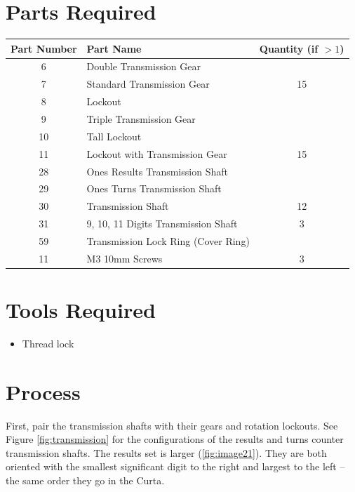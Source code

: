\documentclass[openany]{book}
\begin{document}
\section{Parts Required}
\begin{table}[!ht]
	\centering
	\begin{tabular}{clc}
		Part Number & Part Name & Quantity (if $>1$) \\ \hline
		6 & Double Transmission Gear &  \\
		7 & Standard Transmission Gear & 15 \\
		8 & Lockout &  \\
		9 & Triple Transmission Gear & \\
		10 & Tall Lockout & \\
		11 & Lockout with Transmission Gear & 15 \\
		28 & Ones Results Transmission Shaft & \\
		29 & Ones Turns Transmission Shaft & \\
		30 & Transmission Shaft & 12 \\
		31 & 9, 10, 11 Digits Transmission Shaft & 3 \\
		59 & Transmission Lock Ring (Cover Ring) & \\ \hline \hline
		11 & M3 10mm Screws & 3
	\end{tabular}
\end{table}

\section{Tools Required}
\begin{itemize} 
	\item Thread lock
\end{itemize}

\section{Process}
First, pair the transmission shafts with their gears and rotation lockouts. See Figure \ref{fig:transmission} for the configurations of the results and turns counter transmission shafts. The results set is larger (\ref{fig:image21}). They are both oriented with the smallest significant digit to the right and largest to the left -- the same order they go in the Curta.
\end{document}
